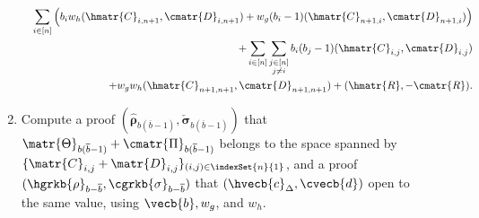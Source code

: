 \begin{description}
\begin{enumerate}
\begin{eqnarray}
& &
    \sum_{i \in [n]}\left(
        b_i w_h (\hmatr{C}_{i,n+1},\cmatr{D}_{i,n+1})+
        w_g(b_i-1) (\hmatr{C}_{n+1,i}, \cmatr{D}_{n+1,i})\right)
        \nonumber\\ & &           +
       \sum_{i \in [n]}  \sum_{\substack{j \in [n]\\ j\neq i}} b_i (b_j-1) (\hmatr{C}_{i,j}, \cmatr{D}_{i,j})\nonumber\\
       & &
     +
    w_gw_h (\hmatr{C}_{n+1,n+1}, \cmatr{D}_{n+1,n+1}) +  (\hmatr{R},-\cmatr{R}).
 \end{eqnarray}

\item Compute a proof $(\hat{\boldsymbol \rho}_{b(\overline{b}-1)},\check{\boldsymbol \sigma}_{b(\overline{b}-1)})$
that $\matr{\Theta}_{b(\overline{b}-1)}+\cmatr{\Pi}_{b(\overline{b}-1)}$
belongs to the space spanned by $\{\matr{C}_{i,j}+\matr{D}_{i,j}\}_{(i,j)\in\indexSet{n}{1}}$,
 and a proof 
$(\hgrkb{\rho}_{b-\overline{b}}, \cgrkb{\sigma}_{b-\overline{b}})$
that
$(\hvecb{c}_\Delta,\cvecb{d})$ open to the same value,
using $\vecb{b},w_g$, and $w_h$. 
\end{enumerate}


\end{description}
